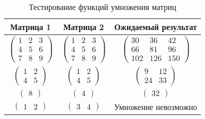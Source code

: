 \begin{table}[ht]
    \caption{\centering Тестирование функций умножения матриц}
    \centering
    \begin{tabular}{ccc}
    Матрица 1 & Матрица 2 & Ожидаемый результат \\ \hline
    $\begin{pmatrix}
        1 & 2 & 3 \\
        4 & 5 & 6 \\
        7 & 8 & 9
    \end{pmatrix}$
    &$\begin{pmatrix}
        1 & 2 & 3 \\
        4 & 5 & 6 \\
        7 & 8 & 9
    \end{pmatrix}$
    &$\begin{pmatrix}
        30 & 36 & 42 \\
        66 & 81 & 96 \\
        102 & 126 & 150
    \end{pmatrix}$\\
    $\begin{pmatrix}
        1 & 2 \\
        4 & 5
    \end{pmatrix}$
    &$\begin{pmatrix}
        1 & 2 \\
        4 & 5
    \end{pmatrix}$
    &$\begin{pmatrix}
        9 & 12 \\
        24 & 33
    \end{pmatrix}$\\
    $\begin{pmatrix}
        8
    \end{pmatrix}$
    &$\begin{pmatrix}
        4
    \end{pmatrix}$
    &$\begin{pmatrix}
        32
    \end{pmatrix}$\\
    $\begin{pmatrix} 1 & 2 \end{pmatrix}$ & $\begin{pmatrix} 3 & 4 \end{pmatrix}$ & Умножение невозможно
    \end{tabular}
    \label{tab:tests}
    \end{table}

